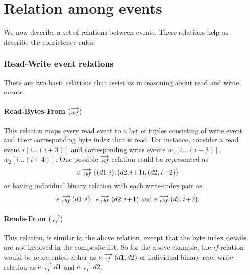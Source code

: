     \section{Relation among events}
        We now describe a set of relations between events. These relations help us describe the consistency rules.
        
        \subsubsection{Read-Write event relations}
        There are two basic relations that assist us in reasoning about read and write events.
        
            \paragraph{Read-Bytes-From $(\stackrel{\longrightarrow}{_{rbf}})$}
            
            This relation maps every read event to a list of tuples consisting of write event and their corresponding byte index that is read. For instance, consider a read event $r[i...(i+3)]$ and corresponding write events $w_1[i...(i+3)]$, $w_2[i...(i+4)]$. One possible $\stackrel{\longrightarrow}{_\textit{rbf}}$ relation could be represented as  
                \[e\stackrel{\longrightarrow}{_{\textit{rbf}}}\{(d1, i), (d2, i\!+\!1), (d2, i\!+\!2)\} \]
            or having individual binary relation with each write-index pair as 
            \begin{align*}
                e\stackrel{\longrightarrow}{_{rbf}}(d1, i),\ e\stackrel{\longrightarrow}{_{rbf}}(d2, i\!+\!1)  \text{ and } e\stackrel{\longrightarrow}{_{rbf}}(d2, i\!+\!2).
            \end{align*}
            
            \paragraph{Reads-From $(\stackrel{\longrightarrow}{_{rf}})$}
            
            This relation, is similar to the above relation, except that the byte index details are not involved in the composite list. So for the above example, the \textit{rf} relation would be represented either as   
                $e\stackrel{\longrightarrow}{_{rf}}(d1, d2)$
            or individual binary read-write relation as 
                $e\stackrel{\longrightarrow}{_{rf}}d1$ and $e\stackrel{\longrightarrow}{_{rf}}d2$.
            
